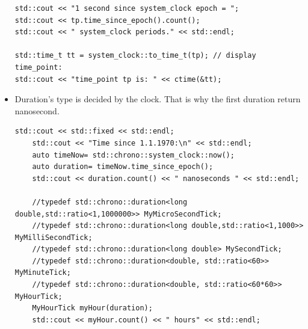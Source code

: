 \documentclass[a4paper,11pt,twoside]{book}
\begin{document}
\begin{itemize}
\begin{lstlisting}[numbers=none]
std::cout << "1 second since system_clock epoch = ";
std::cout << tp.time_since_epoch().count();
std::cout << " system_clock periods." << std::endl;

std::time_t tt = system_clock::to_time_t(tp); // display time_point:
std::cout << "time_point tp is: " << ctime(&tt);
\end{lstlisting}
	
	\item Duration's type is decided by the clock. That is why the first duration return nanosecond. 
\begin{lstlisting}[numbers=none]
	std::cout << std::fixed << std::endl;
	std::cout << "Time since 1.1.1970:\n" << std::endl;	
	auto timeNow= std::chrono::system_clock::now();
	auto duration= timeNow.time_since_epoch();
	std::cout << duration.count() << " nanoseconds " << std::endl;

	//typedef std::chrono::duration<long double,std::ratio<1,1000000>> MyMicroSecondTick;
	//typedef std::chrono::duration<long double,std::ratio<1,1000>> MyMilliSecondTick;
	//typedef std::chrono::duration<long double> MySecondTick;
	//typedef std::chrono::duration<double, std::ratio<60>> MyMinuteTick;
	//typedef std::chrono::duration<double, std::ratio<60*60>> MyHourTick;
	MyHourTick myHour(duration);
	std::cout << myHour.count() << " hours" << std::endl;
\end{lstlisting}

\end{itemize}
\end{document}
